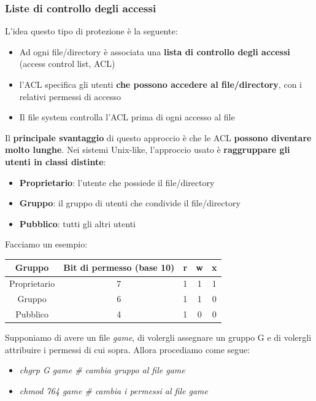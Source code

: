 \documentclass[12pt]{article}
\begin{document}
\subsubsection{Liste di controllo degli accessi}
L'idea questo tipo di protezione è la seguente:
\begin{itemize}
    \item Ad ogni file/directory è associata una \textbf{lista di controllo degli accessi} (access control list, ACL)
    \item l'ACL specifica gli utenti \textbf{che possono accedere al file/directory}, con i relativi permessi di accesso
    \item Il file system controlla l'ACL prima di ogni accesso al file
\end{itemize}
Il \textbf{principale svantaggio} di questo approccio è che le ACL \textbf{possono diventare molto lunghe}.
Nei sistemi Unix-like, l'approccio usato è \textbf{raggruppare gli utenti in classi distinte}:
\begin{itemize}
    \item \textbf{Proprietario}: l'utente che possiede il file/directory
    \item \textbf{Gruppo}: il gruppo di utenti che condivide il file/directory
    \item \textbf{Pubblico}: tutti gli altri utenti
\end{itemize}
Facciamo un esempio:
\begin{table}[H]
    \centering
    \begin{tabular}{|c|c|ccc|}
    \hline
    Gruppo       & Bit di permesso (base 10) & \multicolumn{1}{c|}{r} & \multicolumn{1}{c|}{w} & x \\ \hline
    Proprietario & 7                         & 1                      & 1                      & 1 \\
    Gruppo       & 6                         & 1                      & 1                      & 0 \\
    Pubblico     & 4                         & 1                      & 0                      & 0 \\ \hline
    \end{tabular}
\end{table}
\noindent
Supponiamo di avere un file \textit{game}, di volergli assegnare un gruppo G e di volergli attribuire i permessi di cui sopra.
Allora procediamo come segue:
\begin{itemize}
    \item \textit{chgrp G game  \# cambia gruppo al file game}
    \item \textit{chmod 764 game  \# cambia i permessi al file game}
\end{itemize}
\end{document}
